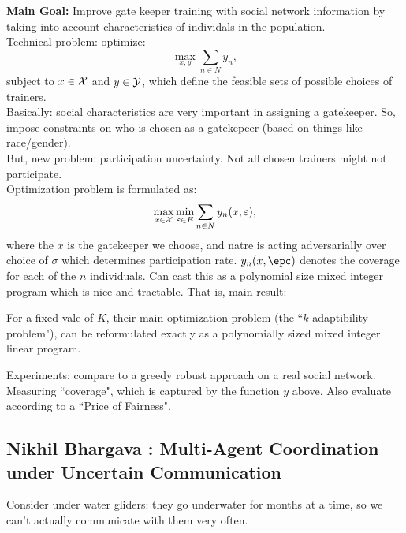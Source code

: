 {\bf Main Goal:} Improve gate keeper training with social network information by taking into account characteristics of individals in the population. \\

Technical problem: optimize:
\begin{equation}
    \max_{x,y} \sum_{n \in N} y_n,
\end{equation}
subject to $x \in \mathcal{X}$ and $y \in \mathcal{Y}$, which define the feasible sets of possible choices of trainers. \\

Basically: social characteristics are very important in assigning a gatekeeper. So, impose constraints on who is chosen as a gatekepeer (based on things like race/gender). \\

But, new problem: participation uncertainty. Not all chosen trainers might not participate. \\

Optimization problem is formulated as:
\begin{equation}
    \max_{x \in \mathcal{X}} \min_{\varepsilon \in E} \sum_{n \in N} y_n(x,\varepsilon),
\end{equation}
where the $x$ is the gatekeeper we choose, and natre is acting adversarially over choice of $\sigma$ which determines participation rate. $y_n(x,\epc)$ denotes the coverage for each of the $n$ individuals. Can cast this as a polynomial size mixed integer program which is nice and tractable. That is, main result:
\begin{theorem}
For a fixed vale of $K$, their main optimization problem (the ``$k$ adaptibility problem"), can be reformulated exactly as a polynomially sized mixed integer linear program.
\end{theorem}

Experiments: compare to a greedy robust approach on a real social network. Measuring ``coverage", which is captured by the function $y$ above. Also evaluate according to a ``Price of Fairness".

\spacerule
\subsection{Nikhil Bhargava	: Multi-Agent Coordination under Uncertain Communication}

Consider under water gliders: they go underwater for months at a time, so we can't actually communicate with them very often.\\

